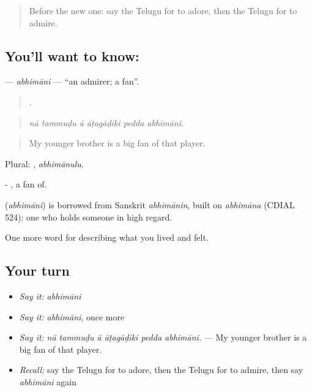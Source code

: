 \label{lesson:TE-C504-abhimani}



\begin{quote}
Before the new one: say the Telugu for to adore, then the Telugu for to admire.
\end{quote}

\subsection*{You'll want to know: }
\textbf{} — \emph{abhimāni} — \textquotedblleft{}an admirer; a fan\textquotedblright{}.

\begin{quote}
     .
\end{quote}

\begin{quote}
\emph{nā tammuḍu ā āṭagāḍiki pedda abhimāni.}
\end{quote}

\begin{quote}
My younger brother is a big fan of that player.
\end{quote}

Plural: , \emph{abhimānulu}.

- , a fan of.

\begin{cousinweb}
\textbf{} (\emph{abhimāni}) is borrowed from Sanskrit \emph{abhimānin}, built on \emph{abhimāna} (CDIAL 524): one who holds someone in high regard.
\end{cousinweb}

\begin{grammarlens}[title={What you've built}]
One more word for describing what you lived and felt.
\end{grammarlens}

\subsection*{Your turn}
\begin{itemize}
\raggedright
  \item \emph{Say it:} \emph{abhimāni}
  \item \emph{Say it:} \emph{abhimāni}, once more
  \item \emph{Say it:} \emph{nā tammuḍu ā āṭagāḍiki pedda abhimāni.} — My younger brother is a big fan of that player.
  \item \emph{Recall:} say the Telugu for to adore, then the Telugu for to admire, then say \emph{abhimāni} again
\end{itemize}

